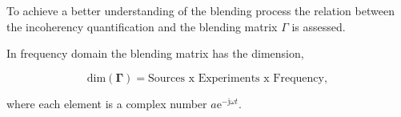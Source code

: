 To achieve a better understanding of the blending process the relation between the incoherency quantification and the blending matrix $\Gamma$ is assessed.

In frequency domain the blending matrix has the dimension,

\begin{equation}
	\text{dim}(\mathbf{\Gamma}) = \text{Sources x Experiments x Frequency},
	\label{eq:Ch-Incoherency-Dim-Gamma}
\end{equation}

where each element is a complex number $a \mathrm{e}^{ - \mathrm{j} \omega t }$.























